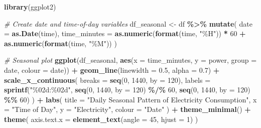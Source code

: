 \documentclass[
]{article}
\newenvironment{Shaded}{\begin{snugshade}}{\end{snugshade}}
\newcommand{\AttributeTok}[1]{\textcolor[rgb]{0.13,0.29,0.53}{#1}}
\newcommand{\CommentTok}[1]{\textcolor[rgb]{0.56,0.35,0.01}{\textit{#1}}}
\newcommand{\DecValTok}[1]{\textcolor[rgb]{0.00,0.00,0.81}{#1}}
\newcommand{\FloatTok}[1]{\textcolor[rgb]{0.00,0.00,0.81}{#1}}
\newcommand{\FunctionTok}[1]{\textcolor[rgb]{0.13,0.29,0.53}{\textbf{#1}}}
\newcommand{\NormalTok}[1]{#1}
\newcommand{\OtherTok}[1]{\textcolor[rgb]{0.56,0.35,0.01}{#1}}
\newcommand{\SpecialCharTok}[1]{\textcolor[rgb]{0.81,0.36,0.00}{\textbf{#1}}}
\newcommand{\StringTok}[1]{\textcolor[rgb]{0.31,0.60,0.02}{#1}}
\begin{document}
\begin{Shaded}
\begin{Highlighting}[]
\FunctionTok{library}\NormalTok{(ggplot2)}


\CommentTok{\# Create date and time{-}of{-}day variables}
\NormalTok{df\_seasonal }\OtherTok{\textless{}{-}}\NormalTok{ df }\SpecialCharTok{\%\textgreater{}\%}
  \FunctionTok{mutate}\NormalTok{(}
    \AttributeTok{date =} \FunctionTok{as.Date}\NormalTok{(time),}
    \AttributeTok{time\_minutes =} \FunctionTok{as.numeric}\NormalTok{(}\FunctionTok{format}\NormalTok{(time, }\StringTok{"\%H"}\NormalTok{)) }\SpecialCharTok{*} \DecValTok{60} \SpecialCharTok{+}
                   \FunctionTok{as.numeric}\NormalTok{(}\FunctionTok{format}\NormalTok{(time, }\StringTok{"\%M"}\NormalTok{))}
\NormalTok{  )}

\CommentTok{\# Seasonal plot}
\FunctionTok{ggplot}\NormalTok{(df\_seasonal,}
       \FunctionTok{aes}\NormalTok{(}\AttributeTok{x =}\NormalTok{ time\_minutes,}
           \AttributeTok{y =}\NormalTok{ power,}
           \AttributeTok{group =}\NormalTok{ date,}
           \AttributeTok{colour =}\NormalTok{ date)) }\SpecialCharTok{+}
  \FunctionTok{geom\_line}\NormalTok{(}\AttributeTok{linewidth =} \FloatTok{0.5}\NormalTok{, }\AttributeTok{alpha =} \FloatTok{0.7}\NormalTok{) }\SpecialCharTok{+}
  \FunctionTok{scale\_x\_continuous}\NormalTok{(}
    \AttributeTok{breaks =} \FunctionTok{seq}\NormalTok{(}\DecValTok{0}\NormalTok{, }\DecValTok{1440}\NormalTok{, }\AttributeTok{by =} \DecValTok{120}\NormalTok{),}
    \AttributeTok{labels =} \FunctionTok{sprintf}\NormalTok{(}\StringTok{"\%02d:\%02d"}\NormalTok{,}
                     \FunctionTok{seq}\NormalTok{(}\DecValTok{0}\NormalTok{, }\DecValTok{1440}\NormalTok{, }\AttributeTok{by =} \DecValTok{120}\NormalTok{) }\SpecialCharTok{\%/\%} \DecValTok{60}\NormalTok{,}
                     \FunctionTok{seq}\NormalTok{(}\DecValTok{0}\NormalTok{, }\DecValTok{1440}\NormalTok{, }\AttributeTok{by =} \DecValTok{120}\NormalTok{) }\SpecialCharTok{\%\%} \DecValTok{60}\NormalTok{)}
\NormalTok{  ) }\SpecialCharTok{+}
  \FunctionTok{labs}\NormalTok{(}
    \AttributeTok{title =} \StringTok{"Daily Seasonal Pattern of Electricity Consumption"}\NormalTok{,}
    \AttributeTok{x =} \StringTok{"Time of Day"}\NormalTok{,}
    \AttributeTok{y =} \StringTok{"Electricity"}\NormalTok{,}
    \AttributeTok{colour =} \StringTok{"Date"}
\NormalTok{  ) }\SpecialCharTok{+}
  \FunctionTok{theme\_minimal}\NormalTok{() }\SpecialCharTok{+}
  \FunctionTok{theme}\NormalTok{(}
    \AttributeTok{axis.text.x =} \FunctionTok{element\_text}\NormalTok{(}\AttributeTok{angle =} \DecValTok{45}\NormalTok{, }\AttributeTok{hjust =} \DecValTok{1}\NormalTok{)}
\NormalTok{  )}
\end{Highlighting}
\end{Shaded}
\end{document}
